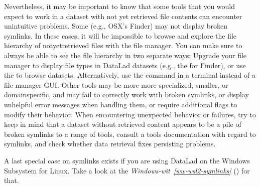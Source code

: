 \sphinxAtStartPar
Nevertheless, it may be important to know that some tools that you would expect to work in a dataset with not yet retrieved file contents can encounter unintuitive problems.
Some  (e.g., OSX’s Finder) may not display broken symlinks.
In these cases, it will be impossible to browse and explore the file hierarchy of not\sphinxhyphen{}yet\sphinxhyphen{}retrieved files with the file manager.
You can make sure to always be able to see the file hierarchy in two separate ways:
Upgrade your file manager to display file types in DataLad datasets (e.g., the  for Finder), or use the  to browse datasets.
Alternatively, use the  command in a terminal instead of a file manager GUI.
Other tools may be more more specialized, smaller, or domain\sphinxhyphen{}specific, and may fail to correctly work with broken symlinks, or display unhelpful error messages when handling them, or require additional flags to modify their behavior.
When encountering unexpected behavior or failures, try to keep in mind that a dataset without retrieved content appears to be a pile of broken symlinks to a range of tools, consult a tools documentation with regard to symlinks, and check whether data retrieval fixes persisting problems.

\sphinxAtStartPar
A last special case on symlinks exists if you are using DataLad on the Windows Subsystem for Linux. Take a look at the \textit{Windows-wit}~{\windowswiticoninline}\textit{\ref{ww-wsl2-symlinks}} {\hyperref[\detokenize{basics/101-115-symlinks:ww-wsl2-symlinks}]{}} ()
for that.

